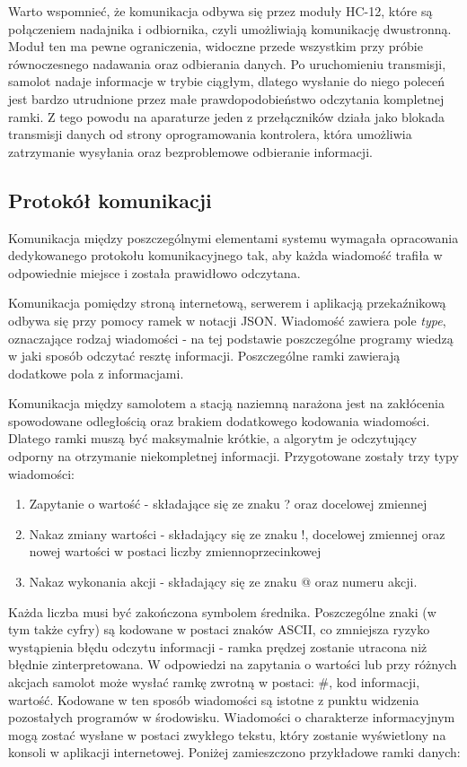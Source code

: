 \documentclass[12pt, a4paper]{article}
\begin{document}
Warto wspomnieć, że komunikacja odbywa się przez moduły HC-12, które są połączeniem nadajnika i odbiornika, czyli umożliwiają komunikację dwustronną. Moduł ten ma pewne ograniczenia, widoczne przede wszystkim przy próbie równoczesnego nadawania oraz odbierania danych. Po uruchomieniu transmisji, samolot nadaje informacje w trybie ciągłym, dlatego wysłanie do niego poleceń jest bardzo utrudnione przez małe prawdopodobieństwo odczytania kompletnej ramki. Z tego powodu na aparaturze jeden z przełączników działa jako blokada transmisji danych od strony oprogramowania kontrolera, która umożliwia zatrzymanie wysyłania oraz bezproblemowe odbieranie informacji.

\FloatBarrier
\subsection{Protokół komunikacji}
Komunikacja między poszczególnymi elementami systemu wymagała opracowania dedykowanego protokołu komunikacyjnego tak, aby każda wiadomość trafiła w odpowiednie miejsce i została prawidłowo odczytana. 

Komunikacja pomiędzy stroną internetową, serwerem i aplikacją przekaźnikową odbywa się przy pomocy ramek w notacji JSON. Wiadomość zawiera pole \textit{type}, oznaczające rodzaj wiadomości - na tej podstawie poszczególne programy wiedzą w jaki sposób odczytać resztę informacji. Poszczególne ramki zawierają dodatkowe pola z informacjami. 

Komunikacja między samolotem a stacją naziemną narażona jest na zakłócenia spowodowane odległością oraz brakiem dodatkowego kodowania wiadomości. Dlatego ramki muszą być maksymalnie krótkie, a algorytm je odczytujący odporny na otrzymanie niekompletnej informacji. Przygotowane zostały trzy typy wiadomości:

\begin{enumerate}
	\item Zapytanie o wartość - składające się ze znaku ? oraz docelowej zmiennej
	\item Nakaz zmiany wartości - składający się ze znaku !, docelowej zmiennej oraz nowej wartości w postaci liczby zmiennoprzecinkowej
	\item Nakaz wykonania akcji - składający się ze znaku @ oraz numeru akcji.	
\end{enumerate}

Każda liczba musi być zakończona symbolem średnika. Poszczególne znaki (w tym także cyfry) są kodowane w postaci znaków ASCII, co zmniejsza ryzyko wystąpienia błędu odczytu informacji - ramka prędzej zostanie utracona niż błędnie zinterpretowana. W odpowiedzi na zapytania o wartości lub przy różnych akcjach samolot może wysłać ramkę zwrotną w postaci: \#, kod informacji, wartość. Kodowane w ten sposób wiadomości są istotne z punktu widzenia pozostałych programów w środowisku. Wiadomości o charakterze informacyjnym mogą zostać wysłane w postaci zwykłego tekstu, który zostanie wyświetlony na konsoli w aplikacji internetowej. Poniżej zamieszczono przykładowe ramki danych: 
\end{document}
